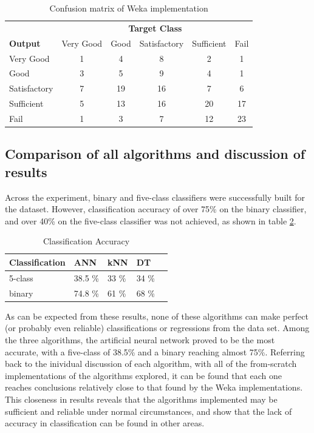 \begin{table}[h]
  \begin{tabular}{l|ccccc}
     & \multicolumn{5}{c}{\textbf{Target Class}} \\ 
  \textbf{Output} & Very Good & Good & Satisfactory & Sufficient & Fail \\  \hline
  Very Good  & 1 & 4 & 8 & 2 & 1\\
     Good & 3 & 5 & 9 & 4 & 1\\
     Satisfactory & 7 & 19 & 16 & 7 & 6\\
     Sufficient & 5 & 13 & 16 & 20 & 17\\
     Fail & 1 & 3 & 7 & 12 & 23\\
  \end{tabular}
  \caption{Confusion matrix of Weka implementation}
\label{tab:DT5level_weka}
\end{table}

\subsection{Comparison of all algorithms and discussion of results}
Across the experiment, binary and five-class classifiers were successfully built for the dataset. However, classification accuracy of over 75\% on the binary classifier, and over 40\% on the five-class classifier was not achieved, as shown in table \ref{tab:ClassificationAccuracy}.\\

\begin {table}[h]
\begin{center}
  \begin{tabular}{lllll}  
    \hline
   \textbf{Classification} & \textbf{ANN} & \textbf{kNN} & \textbf{DT} \\ \hline
    5-class & 38.5 \% & 33 \% & 34 \% \\
    binary & 74.8 \% & 61 \% & 68 \% \\
    \hline
  \end{tabular}
  \caption{Classification Accuracy}
 \label{tab:ClassificationAccuracy}
\end{center}
\end{table}

As can be expected from these results, none of these algorithms can make perfect (or probably even reliable) classifications or regressions from the data set. Among the three algorithms, the artificial neural network proved to be the most accurate, with a five-class of 38.5\% and a binary reaching almost 75\%. Referring back to the inividual discussion of each algorithm, with all of the from-scratch implementations of the algorithms explored, it can be found that each one reaches conclusions relatively close to that found by the Weka implementations. This closeness in results reveals that the algorithms implemented may be sufficient and reliable under normal circumstances, and show that the lack of accuracy in classification can be found in other areas.


